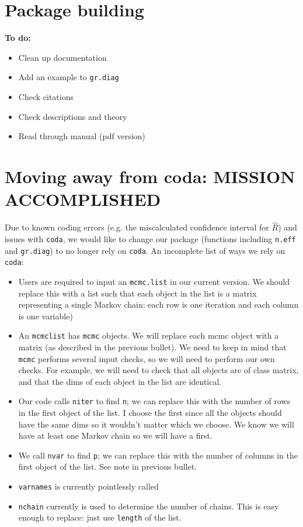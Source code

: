 \documentclass[12pt]{article}
\theoremstyle{remark}
\begin{document}
\section{\textbf{Package building}}
\textbf{To do:}
\begin{itemize}
 \renewcommand{\labelitemi}{$\square$}
\item Clean up documentation
\item Add an example to \texttt{gr.diag} 
\item Check citations
\item Check descriptions and theory
\item Read through manual (pdf version)
\end{itemize}



\section{\textbf{Moving away from coda: MISSION ACCOMPLISHED}}

Due to known coding errors (e.g. the miscalculated confidence interval for $\hat{R}$) and issues with \texttt{coda}, we would like to change our package (functions including \texttt{n.eff} and \texttt{gr.diag}) to no longer rely on \texttt{coda}. An incomplete list of ways we rely on  \texttt{coda}: 

\begin{itemize}
 \renewcommand{\labelitemi}{$\blacksquare$}
\item Users are required to input an \texttt{mcmc.list} in our current version. We should replace this with a list such that each object in the list is a matrix representing a single Markov chain: each row is one iteration and each column is one variable)
\item An \texttt{mcmclist} has \texttt{mcmc} objects. We will replace each mcmc object with a matrix (as described in the previous bullet). We need to keep in mind that \texttt{mcmc} performs several input checks, so we will need to perform our own checks. For example, we will need to check that all objects are of class matrix, and that the dims of each object in the list are identical. 

\item Our code calls \texttt{niter} to find \texttt{n}; we can replace this with the number of rows in the first object of the list. I choose the first since all the objects should have the same dims so it wouldn't matter which we choose. We know we will have at least one Markov chain so we will have a first.
\item We call \texttt{nvar} to find \texttt{p}; we can replace this with the number of columns in the first object of the list. See note in previous bullet.
\item \texttt{varnames} is currently pointlessly called
\item \texttt{nchain} currently is used to determine the number of chains. This is easy enough to replace: just use \texttt{length} of the list.
\end{itemize}










\end{document}
